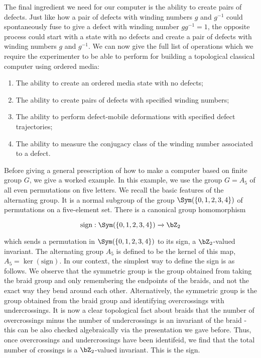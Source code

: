 The final ingredient we need for our computer is the ability to create pairs of defects. Just like how a pair of defects with winding numbers $g$ and $g^{-1}$ could spontaneously fuse to give a defect with winding number $gg^{-1}=1$, the opposite process could start with a state with no defects and create a pair of defects with winding numbers $g$ and $g^{-1}$. We can now give the full list of operations which we require the experimenter to be able to perform for building a topological classical computer using ordered media:

\begin{enumerate}
\item The ability to create an ordered media state with no defects;
\item The ability to create pairs of defects with specified winding numbers;
\item The ability to perform defect-mobile deformations with specified defect trajectories;
\item The ability to measure the conjugacy class of the winding number associated to a defect.
\end{enumerate}

Before giving a general prescription of how to make a computer based on finite group $G$, we give a worked example. In this example, we use the group $G=A_5$ of all even permutations on five letters. We recall the basic features of the alternating group. It is a normal subgroup of the group $ \Sym(\{0,1,2,3,4\})$ of permutations on a five-element set. There is a canonical group homomorphism

$$\text{sign}:\Sym(\{0,1,2,3,4\})\xrightarrow{}\bZ_2$$

which sends a permutation in $\Sym(\{0,1,2,3,4\})$ to its sign, a $\bZ_2$-valued invariant. The alternating group $A_5$ is defined to be the kernel of this map, $A_5=\ker(\text{sign})$. In our context, the simplest way to define the sign is as follows. We observe that the symmetric group is the group obtained from taking the braid group and only remembering the endpoints of the braids, and not the exact way they bend around each other. Alternatively, the symmetric group is the group obtained from the braid group and identifying overcrossings with undercrossings. It is now a clear topological fact about braids that the number of overcrossings minus the number of undercrossings is an invariant of the braid - this can be also checked algebraically via the presentation we gave before. Thus, once overcrossings and undercrossings have been identifeid, we find that the total number of crossings is a $\bZ_2$-valued invariant. This is the sign.

